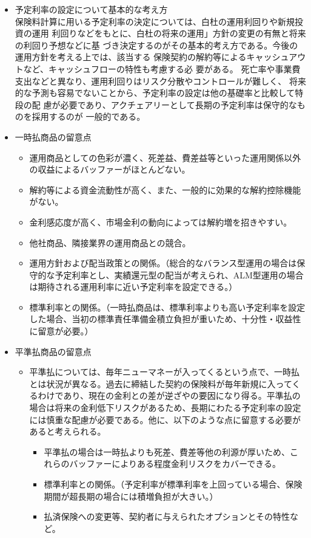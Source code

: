 \documentclass[report,gutter=10mm,fore-edge=10mm,uplatex,dvipdfmx]{jlreq}
\begin{document}
\begin{itemize}
\tightlist
\item
  予定利率の設定について基本的な考え方\\

保険料計算に用いる予定利率の決定については、白杜の運用利回りや新規投資の運用
利回りなどをもとに、白杜の将来の運用」方針の変更の有無と将来の利回り予想などに基
づき決定するのがその基本的考え方である。今後の運用方針を考える上では、該当する
保険契約の解約等によるキャッシュアウトなど、キャッシュフローの特性も考慮する必
要がある。
死亡率や事業費支出などと異なり、運用利回りはリスク分散やコントロールが難しく、
将来的な予測も容易でないことから、予定利率の設定は他の基礎率と比較して特段の配
慮が必要であり、アクチェアリーとして長期の予定利率は保守的なものを採用するのが
一般的である。

\item
  一時払商品の留意点

  \begin{itemize}
  \tightlist
  \item
    運用商品としての色彩が濃く、死差益、費差益等といった運用関係以外の収益によるバッファーがほとんどない。
  \item
    解約等による資金流動性が高く、また、一般的に効果的な解約控除機能がない。
  \item
    金利感応度が高く、市場金利の動向によっては解約増を招きやすい。
  \item
    他社商品、隣接業界の運用商品との競合。
  \item
    運用方針および配当政策との関係。（総合的なバランス型運用の場合は保守的な予定利率とし、実績還元型の配当が考えられ、ALM型運用の場合は期待される運用利率に近い予定利率を設定できる。）
  \item
    標準利率との関係。（一時払商品は、標準利率よりも高い予定利率を設定した場合、当初の標準責任準備金積立負担が重いため、十分性・収益性に留意が必要。）
  \end{itemize}
\item
  平準払商品の留意点

  \begin{itemize}
  \tightlist
  \item
    平準払については、毎年ニューマネーが入ってくるという点で、一時払とは状況が異なる。過去に締結した契約の保険料が毎年新規に入ってくるわけであり、現在の金利との差が逆ざやの要因になり得る。平準払の場合は将来の金利低下リスクがあるため、長期にわたる予定利率の設定には慎重な配慮が必要である。他に、以下のような点に留意する必要があると考えられる。

    \begin{itemize}
    \tightlist
    \item
      平準払の場合は一時払よりも死差、費差等他の利源が厚いため、これらのバッファーによりある程度金利リスクをカバーできる。
    \item
      標準利率との関係。（予定利率が標準利率を上回っている場合、保険期間が超長期の場合には積増負担が大きい。）
    \item
      払済保険への変更等、契約者に与えられたオプションとその特性など。
    \end{itemize}
  \end{itemize}
\end{itemize}
\end{document}
